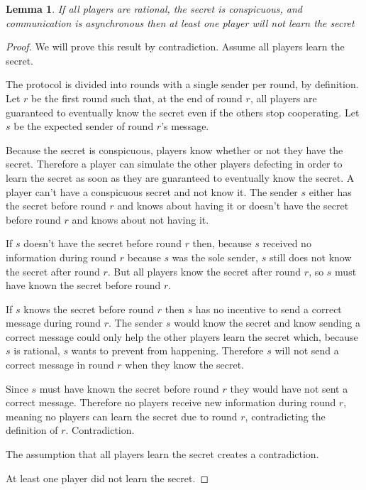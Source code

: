 \documentclass{dalcsthesis}
\newtheorem{lemma}{Lemma}
\begin{document}
\begin{lemma} If all players are rational, the secret is conspicuous, and communication is asynchronous then at least one player will not learn the secret \label{Lem:Async:ConspicuousMustSacrifice} \end{lemma}
\begin{proof}
We will prove this result by contradiction. Assume all players learn the secret.

The protocol is divided into rounds with a single sender per round, by definition. Let $r$ be the first round such that, at the end of round $r$, all players are guaranteed to eventually know the secret even if the others stop cooperating. Let $s$ be the expected sender of round $r$'s message.

Because the secret is conspicuous, players know whether or not they have the secret. Therefore a player can simulate the other players defecting in order to learn the secret as soon as they are  guaranteed to eventually know the secret. A player can't have a conspicuous secret and not know it. The sender $s$ either has the secret before round $r$ and knows about having it or doesn't have the secret before round $r$ and knows about not having it.

If $s$ doesn't have the secret before round $r$ then, because $s$ received no information during round $r$ because $s$ was the sole sender, $s$ still does not know the secret after round $r$. But all players know the secret after round $r$, so $s$ must have known the secret before round $r$.

If $s$ knows the secret before round $r$ then $s$ has no incentive to send a correct message during round $r$. The sender $s$ would know the secret and know sending a correct message could only help the other players learn the secret which, because $s$ is rational, $s$ wants to prevent from happening. Therefore $s$ will not send a correct message in round $r$ when they know the secret.

Since $s$ must have known the secret before round $r$ they would have not sent a correct message. Therefore no players receive new information during round $r$, meaning no players can learn the secret due to round $r$, contradicting the definition of $r$. Contradiction.

The assumption that all players learn the secret creates a contradiction.

At least one player did not learn the secret.
\end{proof}
\end{document}
